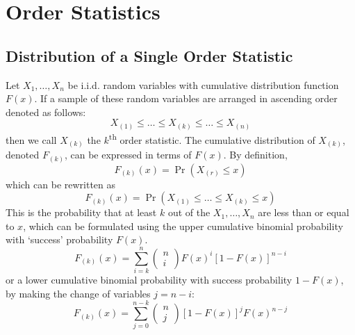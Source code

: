 \documentclass[11pt]{report} %
\begin{document}
\section{Order Statistics}

\subsection{Distribution of a Single Order Statistic}

Let $X_{1}, \dots, X_{n}$ be i.i.d. random variables with cumulative distribution function $F\left(x\right)$. If a sample of these random variables are arranged in ascending order denoted as follows:
\begin{equation}
X_{\left(1\right)} \leq \dots \leq X_{\left(k\right)} \leq \dots \leq X_{\left(n\right)}
\end{equation}
then we call $X_{\left(k\right)}$ the $k$\textsuperscript{th} order statistic. The cumulative distribution of $X_{\left(k\right)}$, denoted $F_{\left(k\right)}$, can be expressed in terms of $F\left(x\right)$. By definition,
\begin{equation}
F_{\left(k\right)}\left(x\right) = \operatorname{Pr}\left(X_{\left(r\right)} \leq x\right)
\end{equation}
which can be rewritten as
\begin{equation}
F_{\left(k\right)}\left(x\right) = \operatorname{Pr}\left(X_{\left(1\right)} \leq \dots \leq X_{\left(k\right)} \leq x\right)
\end{equation}
This is the probability that at least $k$ out of the $X_{1}, \dots, X_{n}$ are less than or equal to $x$, which can be formulated using the upper cumulative binomial probability with `success' probability $F\left(x\right)$.
\begin{equation}
F_{\left(k\right)}\left(x\right) = \sum_{i = k}^{n}\begin{pmatrix}n \\ i\end{pmatrix}F\left(x\right)^{i}\left[1 - F\left(x\right)\right]^{n - i}
\end{equation}
or a lower cumulative binomial probability with success probability $1 - F\left(x\right)$, by making the change of variables $j = n - i$:
\begin{equation}
F_{\left(k\right)}\left(x\right) = \sum_{j = 0}^{n - k}\begin{pmatrix}n \\ j\end{pmatrix}\left[1 - F\left(x\right)\right]^{j}F\left(x\right)^{n - j}
\end{equation}
\end{document}
